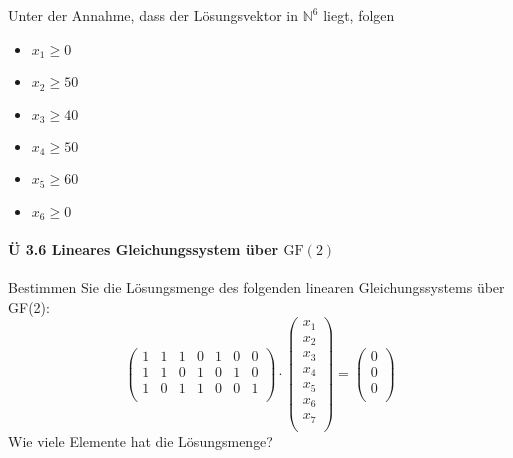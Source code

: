 \documentclass{scrreprt}
\begin{document}
Unter der Annahme, dass der Lösungsvektor in $\mathbb{N}^6$ liegt, folgen
\begin{itemize}
\item $x_1 \geq 0$
\item $x_2 \geq 50$
\item $x_3 \geq 40$
\item $x_4 \geq 50$
\item $x_5 \geq 60$
\item $x_6 \geq 0$
\end{itemize}

\newpage
\paragraph{Ü 3.6 Lineares Gleichungssystem über $\text{GF}(2)$}

Bestimmen Sie die Lösungsmenge des folgenden linearen Gleichungssystems über
GF(2):
\[
  \begin{pmatrix}
    1 & 1 & 1 & 0 & 1 & 0 & 0 \\
    1 & 1 & 0 & 1 & 0 & 1 & 0 \\
    1 & 0 & 1 & 1 & 0 & 0 & 1 \\
  \end{pmatrix}
  \cdot
  \begin{pmatrix}
    x_1 \\
    x_2 \\
    x_3 \\
    x_4 \\
    x_5 \\
    x_6 \\
    x_7 \\
  \end{pmatrix}
  =
  \begin{pmatrix}
    0 \\
    0 \\
    0 \\
  \end{pmatrix}
\]
Wie viele Elemente hat die Lösungsmenge?
\end{document}
